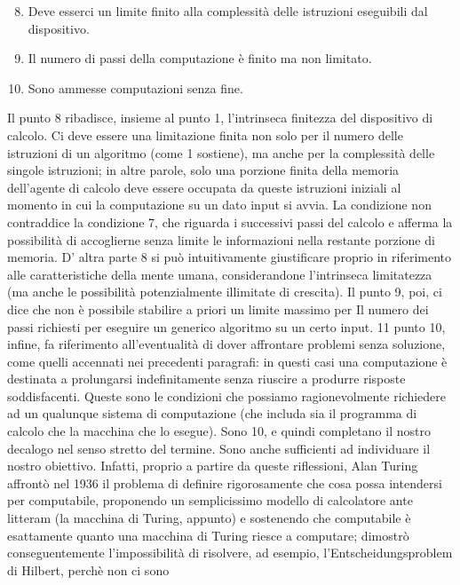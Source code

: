\begin{enumerate}
    \setcounter{enumi}{7}
    \item  Deve esserci un limite finito alla complessità delle istruzioni eseguibili dal
          dispositivo.
    \item Il numero di passi della computazione è finito ma non limitato.
    \item Sono ammesse computazioni senza fine.
\end{enumerate}

Il punto 8 ribadisce, insieme al punto 1, l'intrinseca finitezza del dispositivo di calcolo.
Ci deve essere una limitazione finita non solo per il numero delle istruzioni
di un algoritmo (come 1 sostiene), ma anche per la complessità delle singole istruzioni; in altre parole,
solo una porzione finita della memoria dell'agente di calcolo
deve essere occupata da queste istruzioni iniziali al momento in cui la computazione su un dato input si avvia.
La condizione non contraddice la condizione 7,
che riguarda i successivi passi del calcolo e afferma la possibilità di accoglierne
senza limite le informazioni nella restante porzione di memoria. D' altra parte 8
si può intuitivamente giustificare proprio in riferimento alle caratteristiche della
mente umana, considerandone l'intrinseca limitatezza (ma anche le possibilità potenzialmente illimitate di crescita).
Il punto 9, poi, ci dice che non è possibile stabilire a priori un limite massimo per
Il numero dei passi richiesti per eseguire un generico algoritmo su un certo input.
11 punto 10, infine, fa riferimento all'eventualità di dover affrontare problemi senza soluzione,
come quelli accennati nei precedenti paragrafi: in questi casi una
computazione è destinata a prolungarsi indefinitamente senza riuscire a produrre
risposte soddisfacenti.
Queste sono le condizioni che possiamo ragionevolmente richiedere ad un qualunque sistema di computazione
(che includa sia il programma di calcolo che la macchina che lo esegue).
Sono 10, e quindi completano il nostro decalogo nel
senso stretto del termine. Sono anche sufficienti ad individuare il nostro obiettivo. Infatti, proprio a partire da
queste riflessioni, Alan Turing affrontò nel 1936
il problema di definire rigorosamente che cosa possa intendersi per computabile,
proponendo un semplicissimo modello di calcolatore ante litteram (la macchina
di Turing, appunto) e sostenendo che computabile è esattamente quanto una macchina di Turing riesce a computare;
dimostrò conseguentemente l'impossibilità
di risolvere, ad esempio, l'Entscheidungsproblem di Hilbert, perchè non ci sono
